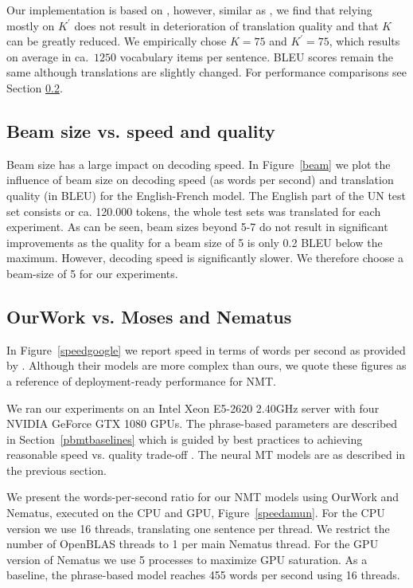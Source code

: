 \documentclass[11pt]{article}
\begin{document}
Our implementation is based on \cite{DBLP:conf/acl/JeanCMB15}, however, similar as \cite{DBLP:conf/acl/MiWI16}, we find that relying mostly on $K^{\prime}$  does not result in  deterioration of translation quality and that $K$ can be greatly reduced. We empirically chose $K=75$ and $K^{\prime}=75$, which results on average in ca.~$1250$ vocabulary items per sentence.  
BLEU scores remain the same although translations are slightly changed. For performance comparisons see Section \ref{comparespeed}.

\subsection{Beam size vs. speed and quality}

Beam size has a large impact on decoding speed. In Figure~\ref{beam} we plot the influence of beam size on decoding speed (as words per second) and translation quality (in BLEU) for the English-French model. The English part of the UN test set consists or ca. 120.000 tokens, the whole test sets was translated for each experiment. As can be seen, beam sizes beyond 5-7 do not result in significant improvements as the quality for a beam size of 5 is only 0.2 BLEU below the maximum. However, decoding speed is significantly slower. We therefore choose a beam-size of 5 for our experiments.  

\subsection{OurWork vs. Moses and Nematus}
\label{comparespeed}
In Figure~\ref{speedgoogle} we report speed in terms of words per second as provided by \cite{google}. Although their models are more complex than ours, we quote these figures as a reference of deployment-ready performance for NMT. 

We ran our experiments on an Intel Xeon E5-2620 2.40GHz server with four NVIDIA GeForce GTX 1080 GPUs. The phrase-based parameters are described in Section~\ref{pbmtbaselines} which is guided by best practices to achieving reasonable speed vs. quality trade-off \cite{junczys_mtsummit_2013}. The neural MT models are as described in the previous section.

We present the words-per-second ratio for our NMT models using OurWork and Nematus, executed on the CPU and GPU, Figure~\ref{speedamun}. For the CPU version we use 16 threads, translating one sentence per thread. We restrict the number of OpenBLAS threads to 1 per main Nematus thread. For the GPU version of Nematus we use 5 processes to maximize GPU saturation. As a baseline, the phrase-based model reaches 455 words per second using 16 threads. 
\end{document}
